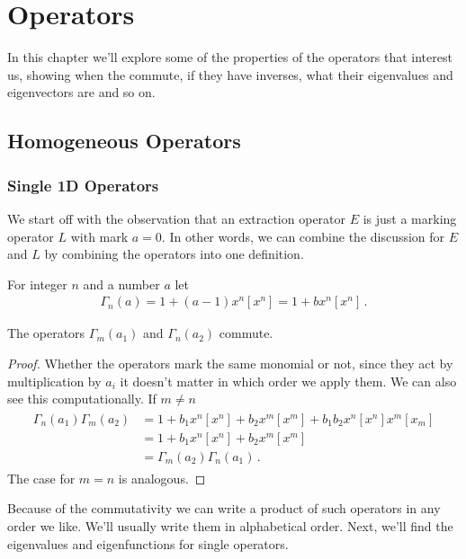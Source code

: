
\chapter{Operators}
\label{ch:Operators}

In this chapter we'll explore some of the properties of the operators that interest us, showing when the commute, if they have inverses, what their eigenvalues and eigenvectors are and so on.


\section{Homogeneous Operators}

\subsection{Single 1D Operators}

We start off with the observation that an extraction operator $E$ is just a marking operator $L$ with mark $a = 0$. In other words, we can combine the discussion for $E$ and $L$ by combining the operators into one definition. 
\begin{definition}
For integer $n$ and a number $a$ let
\begin{align}
	\Gamma_n(a) = 1 + (a-1)x^n[x^n] = 1  + bx^n[x^n]\,.
\end{align}
\end{definition}
\begin{lemma} The operators $\Gamma_m(a_1)$ and $\Gamma_n(a_2)$ commute.
\end{lemma}
\begin{proof} Whether the operators mark the same monomial or not, since they act by multiplication by $a_i$ it doesn't matter in which order we apply them. We can also see this computationally. If $m \neq n$
\begin{align}\begin{split}
	\Gamma_n(a_1)\Gamma_m(a_2) &= 1  +b_1x^n[x^n]+b_2x^m[x^m] + b_1b_2x^n[x^n]x^m[x_m] \\
						&= 1  +b_1x^n[x^n]+b_2x^m[x^m]\\
						&= \Gamma_m(a_2)\Gamma_n(a_1)\,.
\end{split}\end{align}
The case for $m = n$ is analogous.
\end{proof} 
Because of the commutativity we can write a product of such operators in any order we like. We'll usually write them in alphabetical order. Next, we'll find the eigenvalues and eigenfunctions for single operators.

